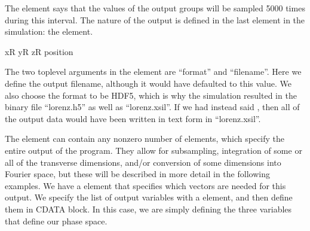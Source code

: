 \documentclass[letterpaper,10pt,english]{sphinxmanual}
\begin{document}
\sphinxAtStartPar
The  element says that the values of the output groups will be sampled 5000 times during this interval.  The nature of the output is defined in the last element in the simulation: the  element.

\begin{sphinxVerbatim}[commandchars=\\\{\}]
  
   
    xR yR zR
    position
    \PYG{c+cp}{\PYGZlt{}![CDATA[}
        
        
        
    \PYG{c+cp}{]]\PYGZgt{}}
\end{sphinxVerbatim}

\sphinxAtStartPar
The two top\sphinxhyphen{}level arguments in the  element are “format” and “filename”.  Here we define the output filename, although it would have defaulted to this value.  We also choose the format to be HDF5, which is why the simulation resulted in the binary file “lorenz.h5” as well as “lorenz.xsil”.  If we had instead said , then all of the output data would have been written in text form in “lorenz.xsil”.

\sphinxAtStartPar
The  element can contain any non\sphinxhyphen{}zero number of  elements, which specify the entire output of the program.  They allow for subsampling, integration of some or all of the transverse dimensions, and/or conversion of some dimensions into Fourier space, but these will be described in more detail in the following examples.  We have a  element that specifies which vectors are needed for this output.  We specify the list of output variables with a  element, and then define them in CDATA block.  In this case, we are simply defining the three variables that define our phase space.
\end{document}
